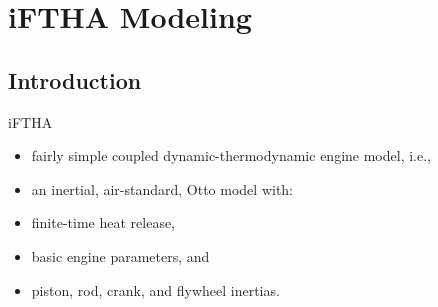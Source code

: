 \section{iFTHA Modeling}

\subsection{Introduction}

    \begin{frame}{iFTHA}\vspace*{-2em}
        \vspace*\medskipamount
        \begin{itemize}
            \item<1->  fairly simple \alert{coupled dynamic-thermodynamic} engine model, i.e.,
            \item<1->  an \alert{inertial}, \alert{air-standard}, Otto model with:
            \item<1->  \alert{finite-time} heat release,
            \item<1->  basic \alert{engine parameters}, and
            \item<1->  \alert{piston}, \alert{rod}, \alert{crank}, and \alert{flywheel}
                inertias.
        \end{itemize}
    \end{frame}

